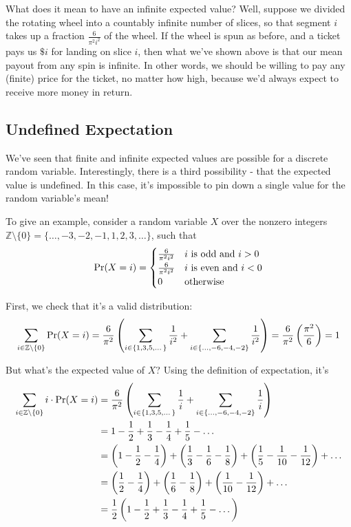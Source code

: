 What does it mean to have an infinite expected value? 
Well, suppose we divided the rotating wheel into a countably infinite number of slices, 
so that segment $i$ takes up a fraction $\frac{6}{\pi^2 i^2}$ of the wheel. 
If the wheel is spun as before, and a ticket pays us $\$i$ for landing on slice $i$, 
then what we've shown above is that our mean payout from any spin is infinite. 
In other words, we should be willing to pay any (finite) price for the ticket, no matter how high, 
because we'd always expect to receive more money in return.


\subsection{Undefined Expectation}
We've seen that finite and infinite expected values are possible for a discrete random variable. 
Interestingly, there is a third possibility - that the expected value is undefined. 
In this case, it's impossible to pin down a single value for the random variable's mean!

To give an example, consider a random variable $X$ over the nonzero integers $\mathbb{Z} \setminus \{0\} = \{\dots, -3, -2, -1, 1, 2, 3, \dots\}$, 
such that 
$$\mbox{\rm Pr}(X = i) = \begin{cases} \frac{6}{\pi^2 i^2} & i \text{ is odd and } i > 0 \\ \frac{6}{\pi^2 i^2} & i \text{ is even and } i < 0 \\ 0 & \text{otherwise} \end{cases} $$

First, we check that it's a valid distribution: 
$$ \sum_{i \in \mathbb{Z} \setminus \{0\}} \mbox{\rm Pr}(X = i)
= \frac{6}{\pi^2} \left( \sum_{i \in \{ 1, 3, 5, \dots \}} \frac{1}{i^2} + \sum_{i \in \{\dots, -6, -4, -2 \}} \frac{1}{i^2} \right) 
= \frac{6}{\pi^2} \left( \frac{\pi^2}{6} \right) = 1 $$

But what's the expected value of $X$? 
Using the definition of expectation, it's 
\begin{align*}
\sum_{i \in \mathbb{Z} \setminus \{0\}} i \cdot \mbox{\rm Pr}(X = i) 
&= \frac{6}{\pi^2} \left( \sum_{i \in \{ 1, 3, 5, \dots \}} \frac{1}{i} + \sum_{i \in \{\dots, -6, -4, -2 \}} \frac{1}{i} \right) \\
&= 1 - \frac{1}{2} + \frac{1}{3} - \frac{1}{4} + \frac{1}{5} - \dots \\
&= \left( 1 - \frac{1}{2} - \frac{1}{4} \right) + \left( \frac{1}{3} - \frac{1}{6} - \frac{1}{8} \right) + \left( \frac{1}{5} - \frac{1}{10} - \frac{1}{12} \right) + \dots \\
&= \left( \frac{1}{2} - \frac{1}{4} \right) + \left( \frac{1}{6} - \frac{1}{8} \right) + \left( \frac{1}{10} - \frac{1}{12} \right) + \dots \\
&= \frac{1}{2} \left( 1 - \frac{1}{2} + \frac{1}{3} - \frac{1}{4} + \frac{1}{5} - \dots \right)
\end{align*}

